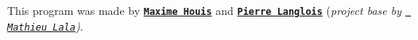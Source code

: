 \label{index_md_README}%
%

This program was made by \href{https://github.com/MaximeHouis}{\texttt{ {\bfseries{Maxime Houis}}}} and \href{https://github.com/Perzi-Lgs}{\texttt{ {\bfseries{Pierre Langlois}}}} ({\itshape project base by \href{https://github.com/Mathieu-Lala}{\texttt{ Mathieu Lala}})}. 